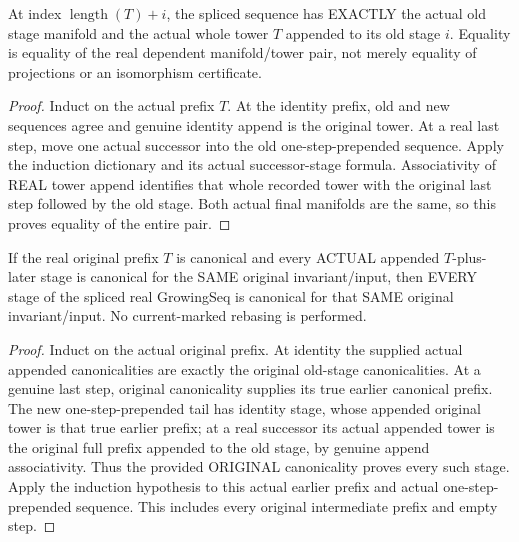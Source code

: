 \begin{lemma}
\label{hir:original-global-prefix-splice-exact-stage}
\leanok
At index $\operatorname{length}(T)+i$, the spliced sequence has EXACTLY the
actual old stage manifold and the actual whole tower $T$ appended to its
old stage $i$. Equality is equality of the real dependent manifold/tower
pair, not merely equality of projections or an isomorphism certificate.
\end{lemma}
\begin{proof}
Induct on the actual prefix $T$. At the identity prefix, old and new
sequences agree and genuine identity append is the original tower. At a
real last step, move one actual successor into the old one-step-prepended
sequence. Apply the induction dictionary and its actual successor-stage
formula. Associativity of REAL tower append identifies that whole recorded
tower with the original last step followed by the old stage. Both actual
final manifolds are the same, so this proves equality of the entire pair.
\end{proof}

\begin{theorem}
\label{hir:original-global-prefix-splice-same-original-canonical}
\leanok
If the real original prefix $T$ is canonical and every ACTUAL appended
$T$-plus-later stage is canonical for the SAME original invariant/input,
then EVERY stage of the spliced real GrowingSeq is canonical for that SAME
original invariant/input. No current-marked rebasing is performed.
\end{theorem}
\begin{proof}
Induct on the actual original prefix. At identity the supplied actual
appended canonicalities are exactly the original old-stage canonicalities.
At a genuine last step, original canonicality supplies its true earlier
canonical prefix. The new one-step-prepended tail has identity stage, whose
appended original tower is that true earlier prefix; at a real successor
its actual appended tower is the original full prefix appended to the old
stage, by genuine append associativity. Thus the provided ORIGINAL
canonicality proves every such stage. Apply the induction hypothesis to
this actual earlier prefix and actual one-step-prepended sequence.
This includes every original intermediate prefix and empty step.
\end{proof}

